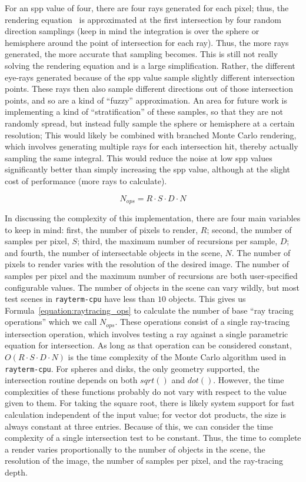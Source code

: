 For an spp value of four, there are four rays generated for each pixel; thus, the rendering equation~\cite{kajiya1986rendering} is approximated at the first intersection by four random direction samplings (keep in mind the integration is over the sphere or hemisphere around the point of intersection for each ray).
Thus, the more rays generated, the more accurate that sampling becomes.
This is still not really solving the rendering equation and is a large simplification.
Rather, the different eye-rays generated because of the spp value sample slightly different intersection points.
These rays then also sample different directions out of those intersection points, and so are a kind of ``fuzzy'' approximation.
An area for future work is implementing a kind of ``stratification'' of these samples, so that they are not randomly spread, but instead fully sample the sphere or hemisphere at a certain resolution;
This would likely be combined with branched Monte Carlo rendering, which involves generating multiple rays for each intersection hit, thereby actually sampling the same integral.
This would reduce the noise at low spp values significantly better than simply increasing the spp value, although at the slight cost of performance (more rays to calculate).

\begin{equation}
\label{equation:raytracing_ops}
  N_{ops} = R \cdot S \cdot D \cdot N
\end{equation}

In discussing the complexity of this implementation, there are four main variables to keep in mind: first, the number of pixels to render, $R$; second, the number of samples per pixel, $S$; third, the maximum number of recursions per sample, $D$; and fourth, the number of intersectable objects in the scene, $N$.
The number of pixels to render varies with the resolution of the desired image.
The number of samples per pixel and the maximum number of recursions are both user-specified configurable values.
The number of objects in the scene can vary wildly, but most test scenes in \texttt{rayterm-cpu} have less than $10$ objects.
This gives us Formula~\ref{equation:raytracing_ops} to calculate the number of base ``ray tracing operations'' which we call $N_{ops}$.
These operations consist of a single ray-tracing intersection operation, which involves testing a ray against a single parametric equation for intersection.
As long as that operation can be considered constant, $O(R \cdot S \cdot D \cdot N)$ is the time complexity of the Monte Carlo algorithm used in \texttt{rayterm-cpu}.
For spheres and disks, the only geometry supported, the intersection routine depends on both $sqrt()$ and $dot()$.
However, the time complexities of these functions probably do not vary with respect to the value given to them.
For taking the square root, there is likely system support for fast calculation independent of the input value; for vector dot products, the size is always constant at three entries.
Because of this, we can consider the time complexity of a single intersection test to be constant.
Thus, the time to complete a render varies proportionally to the number of objects in the scene, the resolution of the image, the number of samples per pixel, and the ray-tracing depth.

